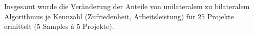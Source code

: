 

Insgesamt wurde die Veränderung der Anteile von unilateralem zu bilateralem Algorithmus je Kennzahl (Zufriedenheit, Arbeitsleistung) für 25 Projekte ermittelt (5 Samples \`{a} 5 Projekte).


